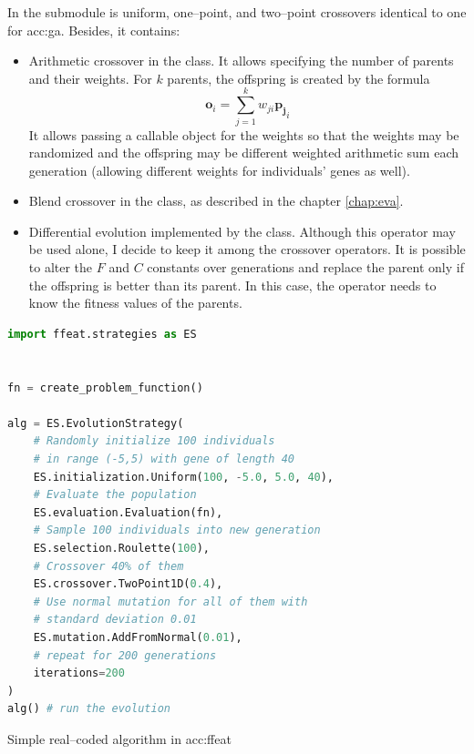 In the  submodule is uniform, one--point, and two--point crossovers identical to one for \acrshort{acc:ga}. Besides, it contains:
\begin{itemize}
    \item Arithmetic crossover in the  class. It allows specifying the number of parents and their weights. For $k$ parents, the offspring is created by the formula 
    $$\mathbf{o}_i=\sum_{j=1}^k w_{ji}\mathbf{p_j}_i$$
    It allows passing a callable object for the weights so that the weights may be randomized and the offspring may be different weighted arithmetic sum each generation (allowing different weights for individuals' genes as well).
    \item Blend crossover in the  class, as described in the chapter \ref{chap:eva}.
    \item Differential evolution implemented by the  class. Although this operator may be used alone, I decide to keep it among the crossover operators. It is possible to alter the $F$ and $C$ constants over generations and replace the parent only if the offspring is better than its parent. In this case, the operator needs to know the fitness values of the parents.
\end{itemize}

\begin{algorithm}[b!]
\begin{lstlisting}[language=Python, xrightmargin=18pt]
import ffeat.strategies as ES


fn = create_problem_function()

alg = ES.EvolutionStrategy(
    # Randomly initialize 100 individuals 
    # in range (-5,5) with gene of length 40
    ES.initialization.Uniform(100, -5.0, 5.0, 40),
    # Evaluate the population
    ES.evaluation.Evaluation(fn),
    # Sample 100 individuals into new generation
    ES.selection.Roulette(100),
    # Crossover 40% of them
    ES.crossover.TwoPoint1D(0.4),
    # Use normal mutation for all of them with 
    # standard deviation 0.01
    ES.mutation.AddFromNormal(0.01),
    # repeat for 200 generations
    iterations=200
)
alg() # run the evolution
\end{lstlisting}
\caption{Simple real--coded algorithm in \acrshort*{acc:ffeat}}
\label{alg:esffeat}
\end{algorithm}

